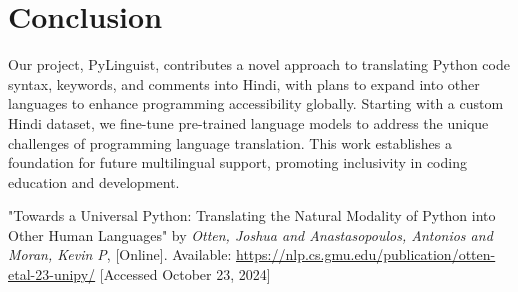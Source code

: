 \documentclass[9pt]{article}
\begin{document}
\section{Conclusion}
Our project, PyLinguist, contributes a novel approach to translating Python code syntax, keywords, and comments into Hindi, with plans to expand into other languages to enhance programming accessibility globally. Starting with a custom Hindi dataset, we fine-tune pre-trained language models to address the unique challenges of programming language translation. This work establishes a foundation for future multilingual support, promoting inclusivity in coding education and development. 


\begin{thebibliography}
    \bibitem"Towards a Universal Python: Translating the Natural Modality of Python into Other Human Languages" by \textit{Otten, Joshua and Anastasopoulos, Antonios and Moran, Kevin P}, [Online]. Available: \url{https://nlp.cs.gmu.edu/publication/otten-etal-23-unipy/} [Accessed October 23, 2024]
\end{thebibliography}
\end{document}
